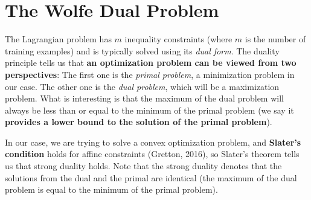 \section{The Wolfe Dual Problem}
The Lagrangian problem has $m$ inequality constraints (where $m$ is the number of training examples) and is typically solved using its \textit{dual form}. The duality principle tells us that \textbf{an optimization problem can be viewed from two perspectives}: \Ni The first one is the \textit{primal problem}, a minimization problem in our case. \Nii The other one is the \textit{dual problem}, which will be a maximization problem. What is interesting is that the maximum of the dual problem will always be less than or equal to the minimum of the primal problem (we say it \textbf{provides a lower bound to the solution of the primal problem}). 

In our case, we are trying to solve a convex optimization problem, and \textbf{Slater's condition} holds for affine constraints (Gretton, 2016), so Slater’s theorem tells us that strong duality holds. Note that the strong duality denotes that the solutions from the dual and the primal are identical (the maximum of the dual problem is equal to the minimum of the primal problem). 


